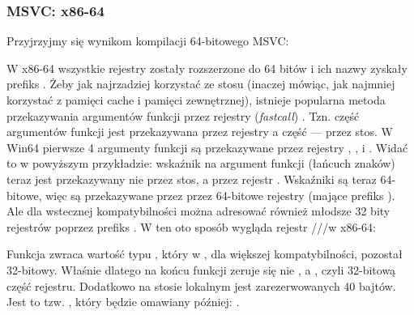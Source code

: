 \subsubsection{MSVC: x86-64}

Przyjrzyjmy się wynikom kompilacji 64-bitowego MSVC:




W x86-64 wszystkie rejestry zostały rozszerzone do 64 bitów i ich nazwy zyskały prefiks .
Żeby jak najrzadziej korzystać ze stosu (inaczej mówiąc, jak najmniej korzystać z pamięci cache i pamięci zewnętrznej), istnieje popularna metoda przekazywania argumentów funkcji przez rejestry (\emph{fastcall}) .
Tzn. część argumentów funkcji jest przekazywana przez rejestry a część --- przez stos.
W Win64 pierwsze 4 argumenty funkcji są przekazywane przez rejestry \RCX, \RDX,  i .
Widać to w powyższym przykładzie: wskaźnik na argument funkcji \printf (łańcuch znaków) teraz jest przekazywany nie przez stos, a przez rejestr \RCX.
Wskaźniki są teraz 64-bitowe, więc są przekazywane przez przez 64-bitowe rejestry (mające prefiks ).
Ale dla wstecznej kompatybilności można adresować również młodsze 32 bity rejestrów poprzez prefiks .
W ten oto sposób wygląda rejestr \RAX/\EAX/\AX/\AL w x86-64:


Funkcja \main zwraca wartość typu \Tint, który w \CCpp, dla większej kompatybilności,
pozostał 32-bitowy. Właśnie dlatego na końcu funkcji \main zeruje się nie \RAX, a \EAX, czyli 32-bitową część rejestru.
Dodatkowo na stosie lokalnym jest zarezerwowanych 40 bajtów.
Jest to tzw. , który będzie omawiany później: .

